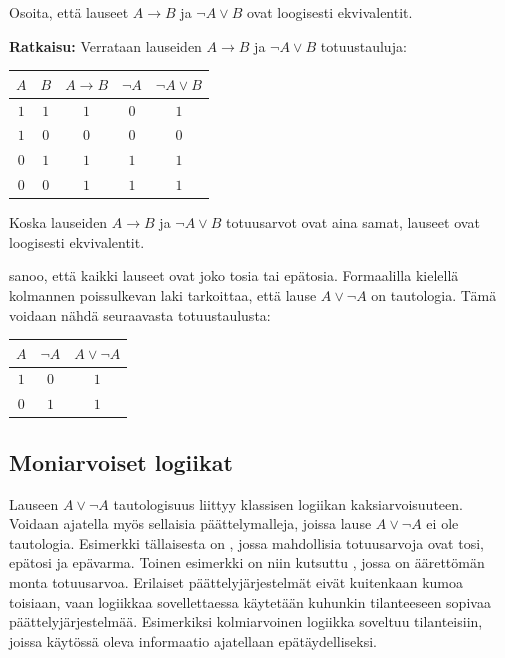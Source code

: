 \begin{esimerkki}
 Osoita, että lauseet $A\to B$ ja $\lnot A \lor B$ ovat loogisesti
ekvivalentit.

{\bf Ratkaisu:}
Verrataan lauseiden $A\to B$ ja $\lnot A \lor B$
totuustauluja: 

\begin{center}
\begin{tabular}{|c|c|c|c|c|}\hline
$A$ & $B$ & $A\to B$ & $\lnot A$ & $\lnot A\lor B$ \\ \hline
$1$ & $1$ & $1$ & $0$ & $1$  \\ %
$1$ & $0$ & $0$ & $0$ & $0$  \\
$0$ & $1$ & $1$ & $1$ & $1$  \\
$0$ & $0$ & $1$ & $1$ & $1$  \\ \hline
\end{tabular}
\end{center}

Koska lauseiden $A\to B$ ja $\lnot A \lor B$ totuusarvot
ovat aina samat, lauseet ovat loogisesti ekvivalentit.
\end{esimerkki}

 sanoo, että kaikki lauseet ovat joko tosia tai epätosia. Formaalilla kielellä kolmannen poissulkevan laki tarkoittaa, että lause $A \lor \lnot A$ on tautologia. Tämä voidaan nähdä seuraavasta totuustaulusta:

\bigskip

\begin{center}
\begin{tabular}{|c|c|c|}\hline
$A$ & $\lnot A$ & $A \lor  \lnot A$ \\ \hline
$1$ & $0$ & $1$\\
$0$ & $1$ & $1$\\ \hline
\end{tabular}
\end{center}

\bigskip


\subsection*{Moniarvoiset logiikat}
Lauseen $A \lor \lnot A$ tautologisuus liittyy klassisen logiikan kaksiarvoisuuteen. Voidaan ajatella myös sellaisia päättelymalleja, joissa lause $A \lor \lnot A$ ei ole tautologia. Esimerkki tällaisesta on , jossa mahdollisia totuusarvoja ovat tosi, epätosi ja epävarma.  Toinen esimerkki on niin kutsuttu , jossa on äärettömän monta totuusarvoa. Erilaiset päättelyjärjestelmät eivät kuitenkaan kumoa toisiaan, vaan logiikkaa sovellettaessa käytetään kuhunkin tilanteeseen sopivaa päättelyjärjestelmää. Esimerkiksi kolmiarvoinen logiikka soveltuu tilanteisiin, joissa käytössä oleva informaatio ajatellaan epätäydelliseksi.


